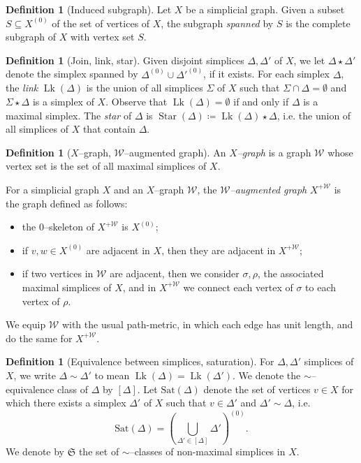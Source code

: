 \documentclass[svgnames]{amsart}
\theoremstyle{plain}
\theoremstyle{definition}
\newtheorem{defn}[thm]{Definition}
\newcommand{\frakS}{\mathfrak S}
\newcommand{\link}{\operatorname{Lk}}
\newcommand{\duaug}[2]{{#1}^{+{#2}}}
\newcommand{\Sat}{\mathrm{Sat}}
\newcommand{\W}{\mathcal{W}}
\begin{document}
\begin{defn}[Induced subgraph]
    Let $X$ be a simplicial graph. Given a subset $S\subseteq X^{(0)}$ of the set of vertices of $X$, the subgraph \emph{spanned} by $S$ is the complete subgraph of $X$ with vertex set $S$.
\end{defn}

\begin{defn}[Join, link, star]\label{defn:join_link_star}
Given disjoint simplices $\Delta,\Delta'$ of $X$, we let $\Delta\star\Delta'$ denote the simplex spanned by $\Delta^{(0)}\cup\Delta'^{(0)}$, if it exists. For each simplex $\Delta$, the \emph{link} $\link(\Delta)$ is the union of 
all simplices $\Sigma$ of $X$ such that $\Sigma\cap\Delta=\emptyset$ and $\Sigma\star\Delta$ is a simplex of $X$.  Observe that $\link(\Delta)=\emptyset$ if and only if $\Delta$ is a maximal simplex. The \emph{star} of $\Delta$ is $\operatorname{Star}(\Delta)\coloneq \link(\Delta)\star\Delta$, i.e. the union of all simplices of $X$ that contain $\Delta$.
\end{defn}

\begin{defn}[$X$--graph, $\W$--augmented graph]\label{defn:X_graph}
An \emph{$X$--graph} is a graph $\W$ whose vertex set is the set of all maximal simplices of $X$.

For a simplicial graph $X$ and an $X$--graph $\W$, the \emph{$\W$--augmented graph} $\duaug{X}{\W}$ is the graph defined as follows:
\begin{itemize}
     \item the $0$--skeleton of $\duaug{X}{\W}$ is $X^{(0)}$;
     \item if $v,w\in X^{(0)}$ are adjacent in $X$, then they are adjacent in $\duaug{X}{\W}$; 	
     \item if two vertices in $\W$ are adjacent, then we consider $\sigma,\rho$, the associated maximal simplices of $X$, and in $\duaug{X}{\W}$ we connect each vertex of $\sigma$ to each vertex of $\rho$.
\end{itemize}
We equip $\W$ with the usual path-metric, in which each edge has unit length, and do the same for $\duaug{X}{\W}$.
\end{defn}


\begin{defn}[Equivalence between simplices, saturation]\label{defn:simplex_equivalence}
For $\Delta,\Delta'$ simplices of $X$, we write $\Delta\sim\Delta'$ to mean $\link(\Delta)=\link(\Delta')$. We denote the $\sim$--equivalence class of $\Delta$ by $[\Delta]$.
Let $\Sat(\Delta)$ denote the set of vertices $v\in X$ for which there exists a simplex $\Delta'$ of $X$ such that $v\in\Delta'$ and $\Delta'\sim\Delta$, i.e.
$$\Sat(\Delta)=\left(\bigcup_{\Delta'\in[\Delta]}\Delta'\right)^{(0)}.$$
We denote by $\frakS$ the set of $\sim$--classes of non-maximal simplices in $X$.
\end{defn}
\end{document}
